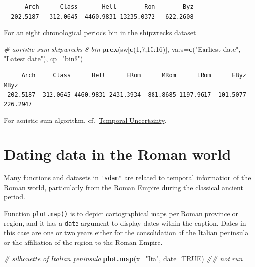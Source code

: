 \documentclass[a4paper,11pt]{memoir}
\newenvironment{Shaded}{\begin{snugshade}}{\end{snugshade}}
\newcommand{\CommentTok}[1]{\textcolor[rgb]{0.56,0.35,0.01}{\textit{#1}}}
\newcommand{\DataTypeTok}[1]{\textcolor[rgb]{0.13,0.29,0.53}{#1}}
\newcommand{\DecValTok}[1]{\textcolor[rgb]{0.00,0.00,0.81}{#1}}
\newcommand{\KeywordTok}[1]{\textcolor[rgb]{0.13,0.29,0.53}{\textbf{#1}}}
\newcommand{\NormalTok}[1]{#1}
\newcommand{\OperatorTok}[1]{\textcolor[rgb]{0.81,0.36,0.00}{\textbf{#1}}}
\newcommand{\OtherTok}[1]{\textcolor[rgb]{0.56,0.35,0.01}{#1}}
\newcommand{\StringTok}[1]{\textcolor[rgb]{0.31,0.60,0.02}{#1}}
\begin{document}
\begin{verbatim}
      Arch      Class       Hell        Rom        Byz 
  202.5187   312.0645  4460.9831 13235.0372   622.2608 
\end{verbatim}

For an eight chronological periods bin in the shipwrecks dataset

\begin{Shaded}
\begin{Highlighting}[]
\CommentTok{# aoristic sum shipwrecks 8 bin}
\KeywordTok{prex}\NormalTok{(sw[}\KeywordTok{c}\NormalTok{(}\DecValTok{1}\NormalTok{,}\DecValTok{7}\NormalTok{,}\DecValTok{15}\OperatorTok{:}\DecValTok{16}\NormalTok{)], }\DataTypeTok{vars=}\KeywordTok{c}\NormalTok{(}\StringTok{"Earliest date"}\NormalTok{, }\StringTok{"Latest date"}\NormalTok{), }\DataTypeTok{cp=}\StringTok{"bin8"}\NormalTok{)}
\end{Highlighting}
\end{Shaded}

\begin{verbatim}
     Arch     Class      Hell      ERom      MRom      LRom      EByz      MByz 
 202.5187  312.0645 4460.9831 2431.3934  881.8685 1197.9617  101.5077  226.2947 
\end{verbatim}

For aoristic sum algorithm,
cf.~\href{https://mplex.github.io/cedhar/Uncertainty.html}{Temporal
Uncertainty}.

\hypertarget{dating-data-in-the-roman-world}{%
\section{Dating data in the Roman
world}\label{dating-data-in-the-roman-world}}

Many functions and datasets in \texttt{"sdam"} are related to temporal
information of the Roman world, particularly from the Roman Empire
during the classical ancient period.

Function \texttt{plot.map()} is to depict cartographical maps per Roman
province or region, and it has a
\texttt{\textquotesingle{}date\textquotesingle{}} argument to display
dates within the caption. Dates in this case are one or two years either
for the consolidation of the Italian peninsula or the affiliation of the
region to the Roman Empire.

\begin{Shaded}
\begin{Highlighting}[]
\CommentTok{# silhouette of Italian peninsula}
\KeywordTok{plot.map}\NormalTok{(}\DataTypeTok{x=}\StringTok{"Ita"}\NormalTok{, }\DataTypeTok{date=}\OtherTok{TRUE}\NormalTok{)}
\CommentTok{## not run}
\end{Highlighting}
\end{Shaded}
\end{document}
